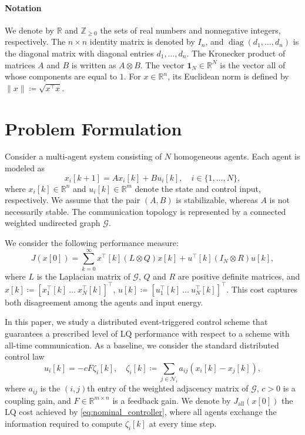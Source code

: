 \documentclass[letterpaper,10pt,conference]{ieeeconf}
\newcommand{\R}{\mathbb{R}}
\newcommand{\Z}{\mathbb{Z}}
\DeclareMathOperator{\diag}{diag}
\newcommand{\graph}{\mathcal{G}}
\begin{document}
\paragraph*{Notation}
We denote by $\R$ and $\Z_{\geq 0}$ the sets of real numbers and nonnegative integers, respectively.
The $n \times n$ identity matrix is denoted by $I_n$, and $\diag(d_1,\dots,d_n)$ is the diagonal matrix with diagonal entries $d_1,\dots,d_n$.
The Kronecker product of matrices $A$ and $B$ is written as $A \otimes B$.
The vector $\mathbf{1}_N \in \R^N$ is the vector all of whose components are equal to $1$.
For $x \in \R^n$, its Euclidean norm is defined by $\|x\| \coloneqq \sqrt{x^\top x}$.

\section{Problem Formulation}
\label{sec:problem}

Consider a multi-agent system consisting of $N$ homogeneous agents.
Each agent is modeled as
\begin{equation} \label{eq:mas}
  x_i[k+1] = A x_i[k] + B u_i[k],\quad i \in \{1,\dots,N\},
\end{equation}
where $x_i[k] \in \R^n$ and $u_i[k] \in \R^m$ denote the state and control input, respectively.
We assume that the pair $(A,B)$ is stabilizable, whereas $A$ is not necessarily stable.
The communication topology is represented by a connected weighted undirected graph $\graph$.

We consider the following performance measure:
\begin{equation} \label{eq:lq_cost}
  J(x[0]) = \sum_{k=0}^{\infty} x^\top[k] (L \otimes Q) x[k] + u^\top[k] (I_N \otimes R) u[k],
\end{equation}
where $L$ is the Laplacian matrix of $\graph$, $Q$ and $R$ are positive definite matrices, and
$x[k] \coloneqq [x_1^\top[k]\ \dots\ x_N^\top[k]]^\top$, $u[k] \coloneqq [u_1^\top[k]\ \dots\ u_N^\top[k]]^\top$.
This cost captures both disagreement among the agents and input energy.

In this paper, we study a distributed event-triggered control scheme that guarantees a prescribed level of LQ performance with respect to a scheme with all-time communication.
As a baseline, we consider the standard distributed control law
\begin{equation} \label{eq:nominal_controller}
  u_i[k] = -cF \zeta_i[k],\quad
  \zeta_i[k] \coloneqq \sum_{j \in \mathcal{N}_i} a_{ij} \left(x_i[k] - x_j[k]\right),
\end{equation}
where $a_{ij}$ is the $(i,j)$th entry of the weighted adjacency matrix of $\graph$, $c > 0$ is a coupling gain, and $F \in \R^{m \times n}$ is a feedback gain.
We denote by $J_{\mathrm{all}}(x[0])$ the LQ cost achieved by \eqref{eq:nominal_controller}, where all agents exchange the information required to compute $\zeta_i[k]$ at every time step.
\end{document}
